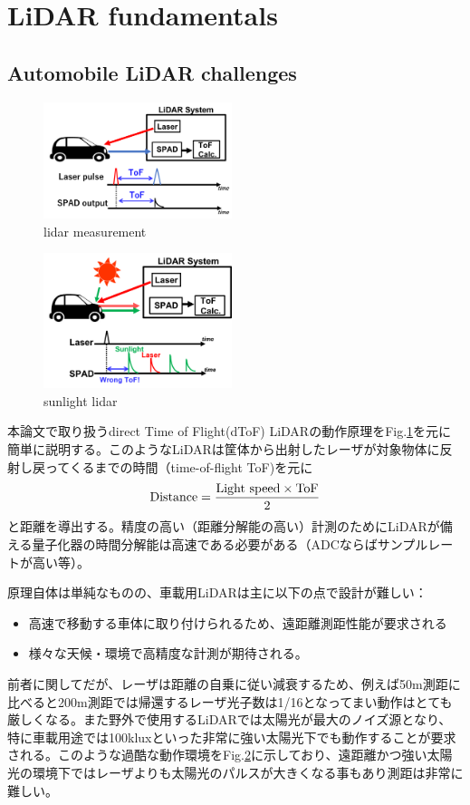 \documentclass[letterpaper, 10 pt, conference]{ieeeconf}  %
\begin{document}
\section{LiDAR fundamentals}
\subsection{Automobile LiDAR challenges}
\begin{figure}[!t]
\centering
 \includegraphics[width=0.49\textwidth]{figs/lidar.png}
  \caption{lidar measurement}
\label{lidar}
\end{figure}

\begin{figure}[!t]
\centering
 \includegraphics[width=0.49\textwidth]{figs/sunlight.png}
  \caption{sunlight lidar}
\label{sunlight}
\end{figure}

本論文で取り扱うdirect Time of Flight(dToF) LiDARの動作原理をFig.\ref{lidar}を元に簡単に説明する。このようなLiDARは筐体から出射したレーザが対象物体に反射し戻ってくるまでの時間（time-of-flight ToF)を元に
\begin{eqnarray}
    \centering
    \textrm{Distance} = \frac{\textrm{Light speed} \times \textrm{ToF}}{2}
    \label{dist}
\end{eqnarray}
と距離を導出する。精度の高い（距離分解能の高い）計測のためにLiDARが備える量子化器の時間分解能は高速である必要がある（ADCならばサンプルレートが高い等）。

原理自体は単純なものの、車載用LiDARは主に以下の点で設計が難しい：
\begin{itemize}
\item 高速で移動する車体に取り付けられるため、遠距離測距性能が要求される
\item 様々な天候・環境で高精度な計測が期待される。
\end{itemize}
前者に関してだが、レーザは距離の自乗に従い減衰するため、例えば50m測距に比べると200m測距では帰還するレーザ光子数は1/16となってまい動作はとても厳しくなる。また野外で使用するLiDARでは太陽光が最大のノイズ源となり、特に車載用途では100kluxといった非常に強い太陽光下でも動作することが要求される。このような過酷な動作環境をFig.\ref{sunlight}に示しており、遠距離かつ強い太陽光の環境下ではレーザよりも太陽光のパルスが大きくなる事もあり測距は非常に難しい。
\end{document}
